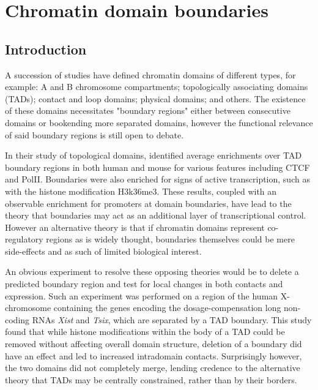 \documentclass[a4paper,11pt,oneside]{book}
\begin{document}

\chapter{Chromatin domain boundaries}\label{chap:boundaries}

\section{Introduction}

A succession of studies have defined chromatin domains of different types, for example: A and B chromosome compartments;\cite{Lieberman2009} topologically associating domains (TADs);\cite{Dixon2012} contact and loop domains;\cite{Rao2014} physical domains;\cite{Sexton2012, Hou2012} and others.\cite{Filippova2014} The existence of these domains necessitates "boundary regions" either between consecutive domains or bookending more separated domains, however the functional relevance of said boundary regions is still open to debate.

In their study of topological domains, \citet{Dixon2012} identified average enrichments over TAD boundary regions in both human and mouse for various features including CTCF and PolII. Boundaries were also enriched for signs of active transcription, such as with the histone modification H3k36me3.\cite{Dixon2012} These results, coupled with an observable enrichment for promoters at domain boundaries, have lead to the theory that boundaries may act as an additional layer of transcriptional control.\cite{Sexton2015} However an alternative theory  is that if chromatin domains represent co-regulatory regions as is widely thought,\cite{LeDily2014, Nora2013, Sexton2015} boundaries themselves could be mere side-effects and as such of limited biological interest.

An obvious experiment to resolve these opposing theories would be to delete a predicted boundary region and test for local changes in both contacts and expression. Such an experiment was performed on a region of the human X-chromosome containing the genes encoding the dosage-compensation long non-coding RNAs \emph{Xist} and \emph{Tsix}, which are separated by a TAD boundary.\cite{Nora2012} This study found that while histone modifications within the body of a TAD could be removed without affecting overall domain structure, deletion of a boundary did have an effect and led to increased intradomain contacts.\cite{Nora2012} Surprisingly however, the two domains did not completely merge, lending credence to the alternative theory that TADs may be centrally constrained, rather than by their borders.\cite{Nora2012} 
\end{document}
